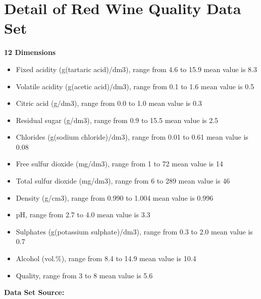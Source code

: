 \documentclass[titlepage,a4paper,12pt,thmsb]{report}
\begin{document}
\chapter*{Detail of Red Wine Quality Data Set}
{\large \bf {12 Dimensions}}
\begin{itemize}
\item{Fixed acidity (g(tartaric acid)/dm3), range from 4.6 to 15.9 mean value is	8.3}
\item{Volatile acidity (g(acetic acid)/dm3),  range from	0.1 to 1.6 mean value is 0.5}
\item{Citric acid (g/dm3), range from 0.0 to 1.0 mean value is 0.3}
\item{Residual sugar (g/dm3), range from 0.9	to 15.5 mean value is 2.5  }
\item{Chlorides (g(sodium chloride)/dm3), range from 0.01 to 0.61 mean value is 0.08}
\item{Free sulfur dioxide (mg/dm3), range from 1 to 72 mean value is 14}
\item{Total sulfur dioxide (mg/dm3), range from 6 to 289 mean value is 46 }
\item{Density (g/cm3), range from 0.990 to 1.004 mean value is 0.996}
\item{pH, range from 2.7 to 4.0 mean value is 3.3 }
\item{Sulphates (g(potassium sulphate)/dm3), range from 0.3 to 2.0 mean value is 0.7 }
\item{Alcohol (vol.\%), range from 8.4 to 14.9 mean value is 10.4 }
\item{Quality, range from 3 to 8 mean value is 5.6}

\end{itemize}
{\large \bf {Data Set Source:}}
\newline{}
{ }
\newline{}
\vspace{0.5cm}




\end{document}
